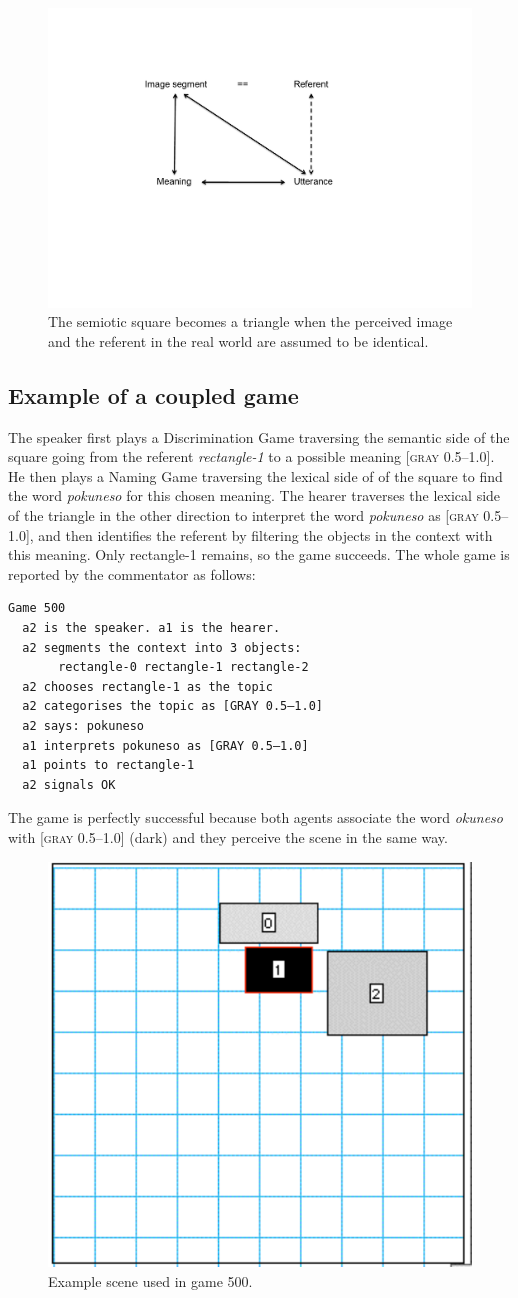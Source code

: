 \begin{figure}[htbp]
  \centerline{\includegraphics[width=.50\textwidth]{chap6/figs/square6.pdf}}
\caption{\label{square6}The semiotic square becomes
a triangle when the perceived image and the referent in the
real world are assumed to be identical.} 
\end{figure}

\subsection{Example of a coupled game}

The speaker first plays a Discrimination Game traversing the 
semantic side of the square going from the referent 
{\itshape rectangle-1} to a possible meaning [\textsc{gray} 0.5–1.0]. 
He then plays a Naming Game traversing the lexical side of 
of the square to find the word \textit{pokuneso} for this chosen meaning. 
The hearer traverses the lexical side of the triangle in 
the other direction to interpret the word \textit{pokuneso} as
{}[\textsc{gray} 0.5–1.0], and then identifies the referent by 
filtering the objects in the context with this meaning. 
Only rectangle-1 remains, so the game succeeds. 
The whole game is reported by the commentator as follows: 
\begin{verbatim}
Game 500
  a2 is the speaker. a1 is the hearer. 
  a2 segments the context into 3 objects: 
       rectangle-0 rectangle-1 rectangle-2
  a2 chooses rectangle-1 as the topic 
  a2 categorises the topic as [GRAY 0.5–1.0]
  a2 says: pokuneso
  a1 interprets pokuneso as [GRAY 0.5–1.0]
  a1 points to rectangle-1
  a2 signals OK 
\end{verbatim}
The game is perfectly successful because both 
agents associate the word \textit{okuneso} with 
{}[\textsc{gray} 0.5–1.0] (dark) and they perceive the scene 
in the same way.


\begin{figure}[htbp]
  \centerline{\includegraphics[width=.40\textwidth]{chap6/figs/recscene.pdf}}
\caption{\label{rect1}Example scene used
in game 500.}
\end{figure}



